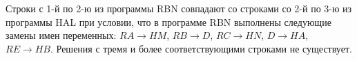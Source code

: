 Строки с 1-й по 2-ю из программы RBN совпадают со строками со 2-й по 3-ю из
программы HAL при условии, что в программе RBN выполнены следующие
замены имен переменных: $RA \rightarrow HM$, $RB \rightarrow D$, $RC \rightarrow HN$, $D \rightarrow HA$, $RE \rightarrow HB$. 
Решения с тремя и более соответствующими строками не существует. 